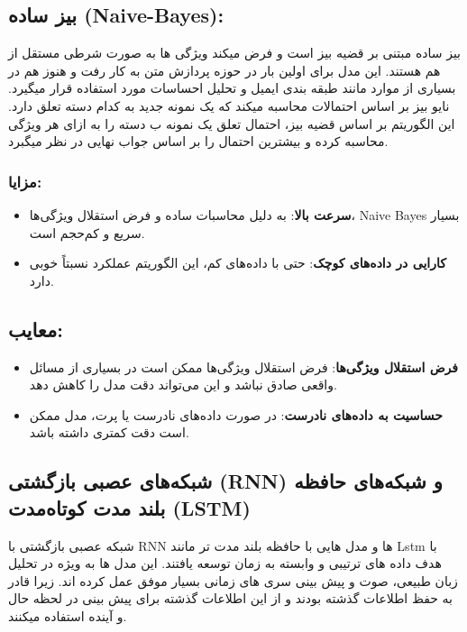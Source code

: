\subsection{ بیز ساده (Naive-Bayes):}
بیز ساده مبتنی بر قضیه بیز است و فرض میکند ویژگی ها به صورت شرطی مستقل از هم هستند. این مدل برای اولین بار در حوزه پردازش متن به کار رفت و هنوز هم در بسیاری از موارد مانند طبقه بندی ایمیل و تحلیل احساسات مورد استفاده قرار میگیرد.
نایو بیز بر اساس احتمالات محاسبه میکند که یک نمونه جدید به کدام دسته تعلق دارد. این الگوریتم بر اساس قضیه بیز، احتمال تعلق یک نمونه ب دسته را به ازای هر ویژگی محاسبه کرده و بیشترین احتمال را بر اساس جواب نهایی در نظر میگبرد.
\subsubsection{مزایا:}

\begin{itemize}
	\item \textbf{سرعت بالا}: به دلیل محاسبات ساده و فرض استقلال ویژگی‌ها، Naive Bayes بسیار سریع و کم‌حجم است.
	\item \textbf{کارایی در داده‌های کوچک}: حتی با داده‌های کم، این الگوریتم عملکرد نسبتاً خوبی دارد.
\end{itemize}

\subsection{معایب:}

\begin{itemize}
	\item \textbf{فرض استقلال ویژگی‌ها}: فرض استقلال ویژگی‌ها ممکن است در بسیاری از مسائل واقعی صادق نباشد و این می‌تواند دقت مدل را کاهش دهد.
	\item \textbf{حساسیت به داده‌های نادرست}: در صورت داده‌های نادرست یا پرت، مدل ممکن است دقت کمتری داشته باشد.
\end{itemize}

\subsection{شبکه‌های عصبی بازگشتی (RNN) و شبکه‌های حافظه بلند مدت کوتاه‌مدت (LSTM)}
شبکه عصبی بازگشتی با RNN  ها و مدل هایی با حافظه بلند مدت تر مانند Lstm  با هدف داده های ترتیبی و وابسته به زمان توسعه یافتند. 
این مدل ها به ویژه در تحلیل زبان طبیعی، صوت و پیش بینی سری های زمانی بسیار موفق عمل کرده اند.
زیرا قادر به حفظ اطلاعات گذشته بودند و از این اطلاعات گذشته برای پیش بینی در لحظه حال و آینده استفاده میکنند.

